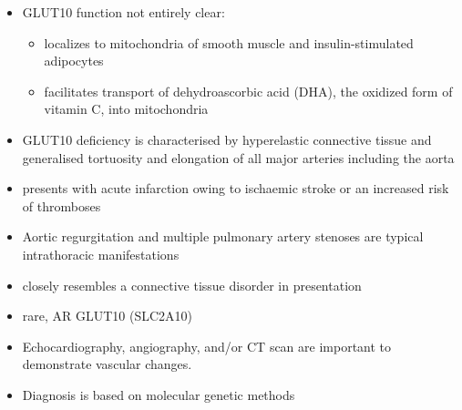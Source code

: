 \documentclass{scrartcl}
\begin{document}
\begin{itemize}
\item GLUT10 function not entirely clear:
\begin{itemize}
\item localizes to mitochondria of smooth muscle and insulin-stimulated adipocytes
\item facilitates transport of dehydroascorbic acid (DHA), the
oxidized form of vitamin C, into mitochondria
\end{itemize}

\item GLUT10 deficiency is characterised by hyperelastic connective tissue
and generalised tortuosity and elongation of all major arteries
including the aorta

\item presents with acute infarction owing to ischaemic stroke or an
increased risk of thromboses
\item Aortic regurgitation and multiple pulmonary artery stenoses are
typical intrathoracic manifestations
\item closely resembles a connective tissue disorder in presentation

\item rare, AR GLUT10 (SLC2A10)
\item Echocardiography, angiography, and/or CT scan are important to demonstrate vascular changes.
\item Diagnosis is based on molecular genetic methods
\end{itemize}
\end{document}
